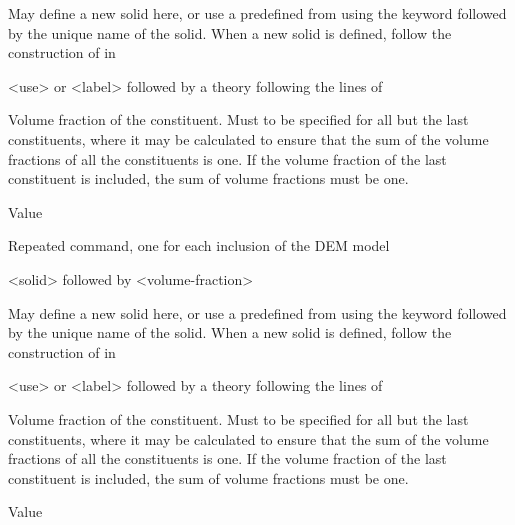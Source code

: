 {
 \slist
   \item \Description May define a new solid here, or use a predefined  from  using the keyword  followed by the unique name of the solid. When a new solid is defined, follow the construction of  in 
   \item \Argument <use> or <label> followed by a theory following the lines of 
   \item \Default
 \elist

 \slist
   \item \Description Volume fraction of the constituent. Must to be specified for all but the last constituents, where it may be calculated to ensure that the sum of the volume fractions of all the constituents is one. If the volume fraction of the last constituent is included, the sum of volume fractions must be one. 
   \item \Argument Value
   \item \Default
 \elist

 \slist
   \item \Description Repeated command, one for each inclusion of the DEM model
   \item \Argument <solid> followed by <volume-fraction>
   \item \Default
 \elist

 \slist
   \item \Description May define a new solid here, or use a predefined  from  using the keyword  followed by the unique name of the solid. When a new solid is defined, follow the construction of  in 
   \item \Argument <use> or <label> followed by a theory following the lines of 
   \item \Default
 \elist

 \slist
   \item \Description Volume fraction of the constituent. Must to be specified for all but the last constituents, where it may be calculated to ensure that the sum of the volume fractions of all the constituents is one. If the volume fraction of the last constituent is included, the sum of volume fractions must be one. 
   \item \Argument Value
   \item \Default
 \elist

}
